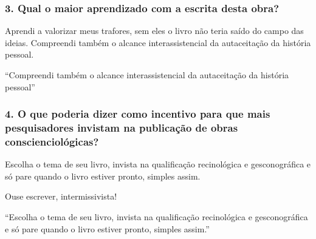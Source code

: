 \documentclass{gescons}
\begin{document}
\begin{multicols}{2}
\subsubsection{3. Qual o maior aprendizado com a escrita desta obra?}

Aprendi a valorizar meus trafores, sem eles o livro não teria saído do campo das ideias. Compreendi também o alcance interassistencial da autaceitação da história pessoal.

\begin{pullquote}
``Compreendi também o alcance interassistencial da autaceitação da história pessoal''
\end{pullquote}


\subsubsection{4. O que poderia dizer como incentivo para que mais pesquisadores invistam na publicação de obras conscienciológicas?}

Escolha o tema de seu livro, invista na qualificação recinológica e gesconográfica e só pare quando o livro estiver pronto, simples assim. 

Ouse escrever, intermissivista!

\begin{pullquote}
``Escolha o tema de seu livro, invista na qualificação recinológica e gesconográfica e só pare quando o livro estiver pronto, simples assim.''
\end{pullquote}



    
    \end{multicols}
\end{document}
